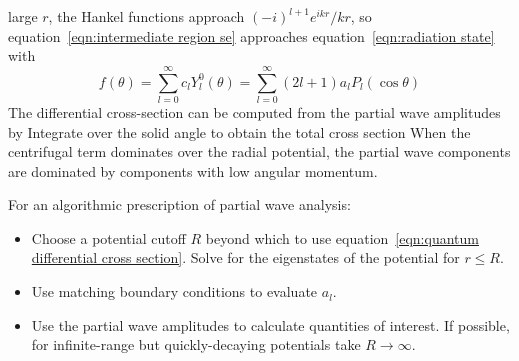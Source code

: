 large $r$, the Hankel functions approach $(-i)^{l+1}e^{ikr}/kr$, so 
equation~\ref{eqn:intermediate region se} approaches 
equation~\ref{eqn:radiation state} with 
\[ 
    f(\theta) = \sum_{l=0}^\infty c_l Y^0_l(\theta)
    = \sum_{l=0}^\infty (2l+1)a_lP_l(\cos\theta)
\] 
The differential cross-section can be computed from the partial wave amplitudes by 
Integrate over the solid angle to obtain the total cross section 
When the centrifugal term dominates over the radial potential, 
the partial wave components are dominated by components with low angular 
momentum. 

For an algorithmic prescription of partial wave analysis: 
\begin{itemize}
    \item Choose a potential cutoff $R$ beyond which to use 
    equation~\ref{eqn:quantum differential cross section}. 
    Solve for the eigenstates of the potential for $r\leq R$. 
    \item Use matching boundary conditions to evaluate $a_l$. 
    \item Use the partial wave amplitudes to calculate quantities of interest. 
    If possible, for infinite-range but quickly-decaying potentials take $R\to \infty$. 
\end{itemize}



